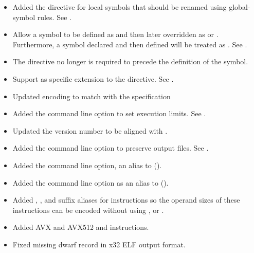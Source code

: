\begin{itemize}
    \item{Added the  directive for local symbols that should be
        renamed using global-symbol rules. See .}

    \item{Allow a symbol to be defined as  and then later
        overridden as  or . Furthermore, a symbol
        declared  and then defined will be treated as .
        See .}

    \item{The  directive no longer is required to precede the
        definition of the symbol.}

    \item{Support  as  specific extension to the
         directive. See .}

    \item{Updated  encoding to match with the specification}

    \item{Added the  command line option to set execution
        limits. See .}

    \item{Updated the  version number to be aligned with .}

    \item{Added the  command line option to preserve output
        files. See .}

    \item{Added the  command line option, an alias to 
        ().}

    \item{Added the  command line option as an alias to 
        ().}

    \item{Added , , and  suffix aliases for 
        instructions so the operand sizes of these instructions can be
        encoded without using ,  or .}
\end{itemize}


\begin{itemize}
    \item{Added AVX and AVX512  and  instructions.}
    \item{Fixed missing dwarf record in x32 ELF output format.}
\end{itemize}

